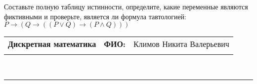 \documentclass[10pt]{exam}
\newcommand{\class}{Дискретная математика}
\newcommand{\examdate}{}
\begin{document}
\begin{questions}
\begin{enumerate}[a)]
\end{enumerate}\question Составьте полную таблицу истинности, определите, какие переменные являются фиктивными и проверьте, является ли формула тавтологией:
$ P \rightarrow (Q \rightarrow ((P \lor Q) \rightarrow (P \land Q)))$

\end{questions}
\newpage
\begin{flushright}
\begin{tabular}{p{2.8in} r l}
\textbf{\class} & \textbf{ФИО:} &Климов Никита Валерьевич
\\

\textbf{\examdate} &&\\
\end{tabular}\\
\end{flushright}
\rule[1ex]{\textwidth}{.1pt}
\end{document}
